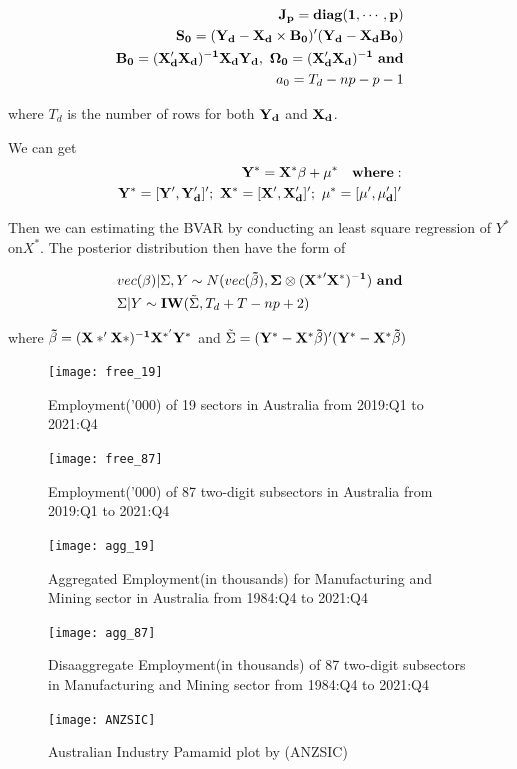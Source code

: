 \documentclass[11pt,a4paper,]{article}
\begin{document}
\[
\begin{aligned}
\bf{J_p}=diag(1,\cdots,p)\\
\bf{S_0}=(Y_d-X_d\times B_0)'(Y_d-X_dB_0)\\
\bf{B_0}=(X_d'X_d)^{-1}X_dY_d,\ \Omega_0=(X_d'X_d)^{-1}\  and\\
a_0=T_d-np-p-1\\
\end{aligned}
\]

where \(T_d\) is the number of rows for both \(\bf{Y}_d\) and \(\bf{X}_d\).

We can get
\begin{align}
\bf{Y^*}=\bf{X^*}\bf{\beta}+\bf{\mu}^*\ \ \  where: \\
\bf{Y^*}=[\bf{Y'},\bf{Y'_d}]';\ \bf{X^*}=[\bf{X'},\bf{X'_d}]';\ \bf{\mu^*}=[\bf{\mu'},\bf{\mu'_d}]'
\end{align}

Then we can estimating the BVAR by conducting an least square regression of \(Y^*\) on\(X^*\). The posterior distribution then have the form of

\begin{align}
&vec(\mathbf{\beta})|\Sigma,Y\sim N(vec(\bf{\tilde\beta}),\Sigma\otimes(\bf{X^*}'\bf{X^*})^{-1})\ and\\
&\Sigma|Y\sim\mathbf{IW}(\tilde\Sigma,T_d+T-np+2)
\end{align}

where \(\bf{\tilde\beta} =(X*'X*)^{-1}X^{*'}Y^*\) and \(\tilde\Sigma=(\bf{Y^*}-\bf{X^*}\bf{\tilde\beta})'(\bf{Y^*}-\bf{X^*}\bf{\tilde\beta})\)

\newpage

\begin{figure}[t]
\texttt{[image: free\_19]}
\centering
\caption{Employment('000) of 19 sectors in Australia from 2019:Q1 to 2021:Q4}
\label{fig:19}
\end{figure}

\begin{figure}[t]
\texttt{[image: free\_87]}
\centering
\caption{Employment('000) of 87 two-digit subsectors in Australia from 2019:Q1 to 2021:Q4}
\label{fig:87}
\end{figure}

\begin{figure}[t]
\texttt{[image: agg\_19]}
\centering
\caption{Aggregated Employment(in thousands) for Manufacturing and Mining sector in Australia from 1984:Q4 to 2021:Q4}
\label{fig:a19}
\end{figure}

\begin{figure}[t]
\texttt{[image: agg\_87]}
\centering
\caption{Disaaggregate Employment(in thousands) of 87 two-digit subsectors in Manufacturing and Mining sector from 1984:Q4 to 2021:Q4}
\label{fig:a87}
\end{figure}

\begin{figure}[t]
\texttt{[image: ANZSIC]}
\centering
\caption{Australian Industry Pamamid plot by (ANZSIC)}
\label{fig:anzsic}
\end{figure}

\clearpage

\printbibliography
\end{document}
